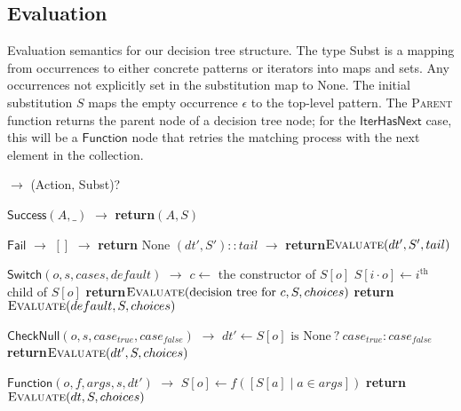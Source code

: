\documentclass{article}
\theoremstyle{definition}
\newcommand{\Success}{\mathsf{Success}}
\newcommand{\CheckNull}{\mathsf{CheckNull}}
\newcommand{\IterHasNext}{\mathsf{IterHasNext}}
\newcommand{\Fail}{\mathsf{Fail}}
\newcommand{\Switch}{\mathsf{Switch}}
\newcommand{\FunctionDT}{\mathsf{Function}}
\newcommand{\CaseItem}[2]{\State #1 $ \to $ #2}
\newcommand{\ret}{\textbf{return}\xspace}
\begin{document}
\subsection{Evaluation}

\begin{algorithm*}
  
  \caption{
    Evaluation semantics for our decision tree structure. The
    type Subst is a mapping from occurrences to either concrete patterns or
    iterators into maps and sets. Any occurrences not explicitly set in the
    substitution map to None. The initial substitution $ S $ maps the empty
    occurrence $ \epsilon $ to the top-level pattern. The \textsc{Parent}
    function returns the parent node of a decision tree node; for the $
    \IterHasNext $ case, this will be a $ \FunctionDT $ node that retries the
    matching process with the next element in the collection.
  }
  \label{alg:tree-evaluate}

  \footnotesize
  \begin{algorithmic}[1]
     $\to$ (Action, Subst)?

        \CaseItem{$\Success(A, \_)$}{\ret $ (A, S) $}

        \CaseItem{$\Fail$}{}
        \Indent
            \CaseItem{$[]$}{\ret None}
            \CaseItem{$(dt', S') :: tail$}{\ret $\textsc{Evaluate}(dt', S', tail)$}
          \EndCase
        \EndIndent

        \CaseItem{$\Switch(o, s, cases, default)$}{}
        \Indent
          \State $ c \gets $ the constructor of $ S[o] $
              \State $ S[i \cdot o] \gets i^{\text{th}} $ child of $ S[o] $
            \EndFor
            \State \ret $ \textsc{Evaluate}(\text{decision tree for } c, S, choices )$
          \Else
            \State \ret $ \textsc{Evaluate}(default, S, choices) $
          \EndIf
        \EndIndent

        \CaseItem{$\CheckNull(o, s, case_{true}, case_{false})$}{}
        \Indent
          \State $ dt' \gets S[o] \text{ is None} \: ? \: case_{true} : case_{false} $
          \State \ret $ \textsc{Evaluate}(dt', S, choices) $
        \EndIndent

        \CaseItem{$\FunctionDT(o, f, args, s, dt')$}{}
        \Indent
          \State $ S[o] \gets f([S[a] \mid a \in args]) $
          \State \ret $ \textsc{Evaluate}(dt, S, choices) $
        \EndIndent


\end{algorithmic}
\end{algorithm*}
\end{document}
